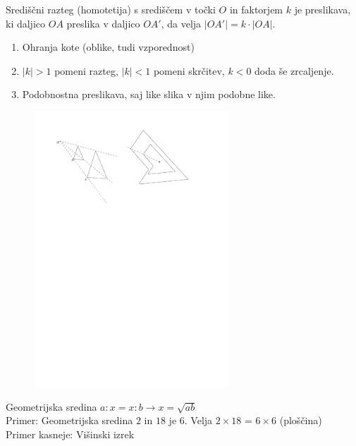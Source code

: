 \documentclass{article}
\begin{document}
  Središčni razteg (homotetija) s središčem v točki $O$ in faktorjem $k$ je preslikava, ki daljico $OA$ preslika v daljico $OA'$, da velja $|OA'|=k\cdot |OA|$.
  \begin{enumerate}[i]
    \item Ohranja kote (oblike, tudi vzporednost)
    \item $|k|>1$ pomeni razteg, $|k|<1$ pomeni skrčitev, $k<0$ doda še zrcaljenje.
    \item Podobnostna preslikava, saj like slika v njim podobne like.
  \end{enumerate}
  \begin{figure}[H]
    \includegraphics[width=0.65\textwidth]{homotetija.pdf}
    \centering
    \end{figure}

  Geometrijska sredina $a:x=x:b\rightarrow x=\sqrt{ab}$\\
  Primer: Geometrijska sredina $2$ in $18$ je $6$. Velja $2\times 18$ = $6\times 6$ (ploščina)\\
  Primer kasneje: Višinski izrek
\end{document}
